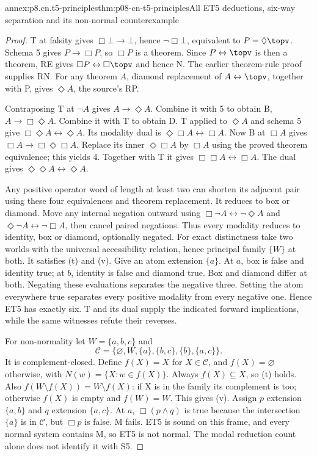 \begin{annexitem}{annex:p8.cn.t5-principles}{thm:p08-cn-t5-principles}{All ET5 deductions, six-way separation and its non-normal counterexample}
\begin{proof}
T at falsity gives \(\Box\bot\to\bot\), hence
\(\neg\Box\bot\), equivalent to \(P=\Diamond\topv\).
Schema 5 gives \(P\to\Box P\), so \(\Box P\) is
a theorem. Since \(P\leftrightarrow\topv\) is then a
theorem, RE gives \(\Box P\leftrightarrow\Box\topv\)
and hence N. The earlier theorem-rule proof supplies RN.
For any theorem \(A\), diamond replacement of
\(A\leftrightarrow\topv\), together with P, gives
\(\Diamond A\), the source's RP.

Contraposing T at \(\neg A\) gives \(A\to\Diamond A\).
Combine it with 5 to obtain B, \(A\to\Box\Diamond A\).
Combine it with T to obtain D. T applied to \(\Diamond A\)
and schema 5 give \(\Box\Diamond A\leftrightarrow\Diamond A\).
Its modality dual is \(\Diamond\Box A\leftrightarrow\Box A\).
Now B at \(\Box A\) gives
\(\Box A\to\Box\Diamond\Box A\).
Replace its inner \(\Diamond\Box A\) by \(\Box A\)
using the proved theorem equivalence; this yields 4.
Together with T it gives \(\Box\Box A\leftrightarrow\Box A\).
The dual gives \(\Diamond\Diamond A\leftrightarrow\Diamond A\).

Any positive operator word of length at least two can shorten
its adjacent pair using these four equivalences and theorem
replacement. It reduces to box or diamond. Move any internal
negation outward using \(\Box\neg A\leftrightarrow
\neg\Diamond A\) and \(\Diamond\neg A\leftrightarrow
\neg\Box A\), then cancel paired negations. Thus every
modality reduces to identity, box or diamond, optionally negated.
For exact distinctness take two worlds with the universal
accessibility relation, hence principal family \(\{W\}\)
at both. It satisfies (t) and (v). Give an atom extension
\(\{a\}\). At \(a\), box is false and identity true;
at \(b\), identity is false and diamond true. Box and
diamond differ at both. Negating these evaluations separates
the negative three. Setting the atom everywhere true separates
every positive modality from every negative one. Hence ET5
has exactly six. T and its dual supply the indicated forward
implications, while the same witnesses refute their reverses.

For non-normality let \(W=\{a,b,c\}\) and
\[
 \mathcal C=\{\varnothing,W,\{a\},\{b,c\},\{b\},\{a,c\}\}.
\]
It is complement-closed. Define \(f(X)=X\) for
\(X\in\mathcal C\), and \(f(X)=\varnothing\) otherwise,
with \(N(w)=\{X:w\in f(X)\}\). Always \(f(X)\subseteq X\),
so (t) holds. Also \(f(W\setminus f(X))=W\setminus f(X)\):
if X is in the family its complement is too; otherwise
\(f(X)\) is empty and \(f(W)=W\). This gives (v).
Assign \(p\) extension \(\{a,b\}\) and \(q\) extension
\(\{a,c\}\). At \(a\), \(\Box(p\land q)\) is true
because the intersection \(\{a\}\) is in \(\mathcal C\),
but \(\Box p\) is false. M fails. ET5 is sound on this
frame, and every normal system contains M, so ET5 is not normal.
The modal reduction count alone does not identify it with S5.
\end{proof}
\end{annexitem}

